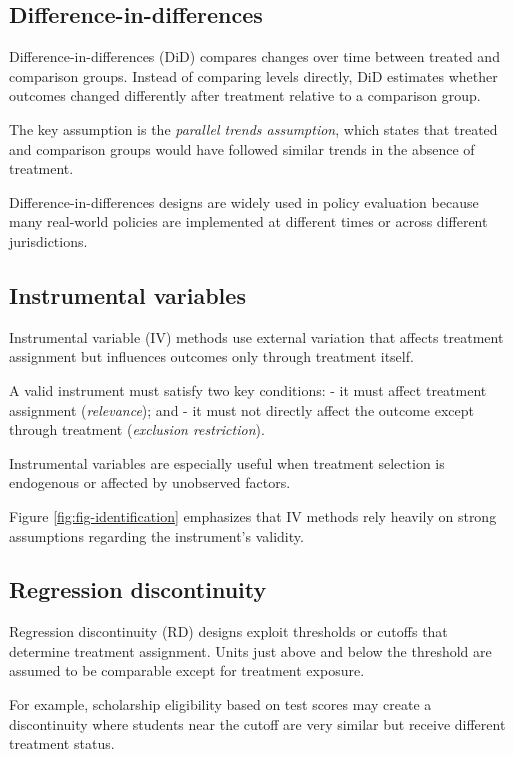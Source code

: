 \documentclass[
  11pt,
  oneside]{book}
\begin{document}
\subsection{Difference-in-differences}\label{difference-in-differences}

Difference-in-differences (DiD) compares changes over time between treated and comparison groups. Instead of comparing levels directly, DiD estimates whether outcomes changed differently after treatment relative to a comparison group.

The key assumption is the \emph{parallel trends assumption}, which states that treated and comparison groups would have followed similar trends in the absence of treatment.

Difference-in-differences designs are widely used in policy evaluation because many real-world policies are implemented at different times or across different jurisdictions.

\subsection{Instrumental variables}\label{instrumental-variables}

Instrumental variable (IV) methods use external variation that affects treatment assignment but influences outcomes only through treatment itself.

A valid instrument must satisfy two key conditions:
- it must affect treatment assignment (\emph{relevance}); and
- it must not directly affect the outcome except through treatment (\emph{exclusion restriction}).

Instrumental variables are especially useful when treatment selection is endogenous or affected by unobserved factors.

Figure \ref{fig:fig-identification} emphasizes that IV methods rely heavily on strong assumptions regarding the instrument's validity.

\subsection{Regression discontinuity}\label{regression-discontinuity}

Regression discontinuity (RD) designs exploit thresholds or cutoffs that determine treatment assignment. Units just above and below the threshold are assumed to be comparable except for treatment exposure.

For example, scholarship eligibility based on test scores may create a discontinuity where students near the cutoff are very similar but receive different treatment status.
\end{document}
